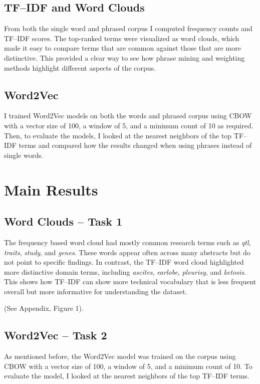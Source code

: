 \documentclass[11pt]{article}
\begin{document}
\subsection{TF--IDF and Word Clouds}
From both the single word and phrased corpus I computed frequency counts and TF--IDF scores. 
The top-ranked terms were visualized as word clouds, which made it easy to compare terms that 
are common against those that are more distinctive. This provided a clear way to see how 
phrase mining and weighting methods highlight different aspects of the corpus.


\subsection{Word2Vec}
I trained Word2Vec models on both the words and phrased corpus using CBOW with a vector size of 100, a window of 5,
and a minimum count of 10 as required. Then, to evaluate the models, I looked at the nearest neighbors of the 
top TF--IDF terms and compared how the results changed when using phrases instead of single words.

\section{Main Results}

\subsection{Word Clouds -- Task 1}
The frequency based word cloud had mostly common research terms such as \textit{qtl}, 
\textit{traits}, \textit{study}, and \textit{genes}. These words appear often across many abstracts but do not 
point to specific findings. In contrast, the TF--IDF word cloud highlighted more distinctive domain terms, 
including \textit{ascites}, \textit{earlobe}, \textit{pleurisy}, and \textit{ketosis}. This shows how TF--IDF can 
show more technical vocabulary that is less frequent overall but more informative for understanding the dataset. 

(See Appendix, Figure 1).  


\subsection{Word2Vec -- Task 2}
As mentioned before, the Word2Vec model was trained on the corpus using CBOW with a vector size of 100, a window of 5, 
and a minimum count of 10. To evaluate the model, I looked at the nearest neighbors of the top TF--IDF terms.  
\end{document}
